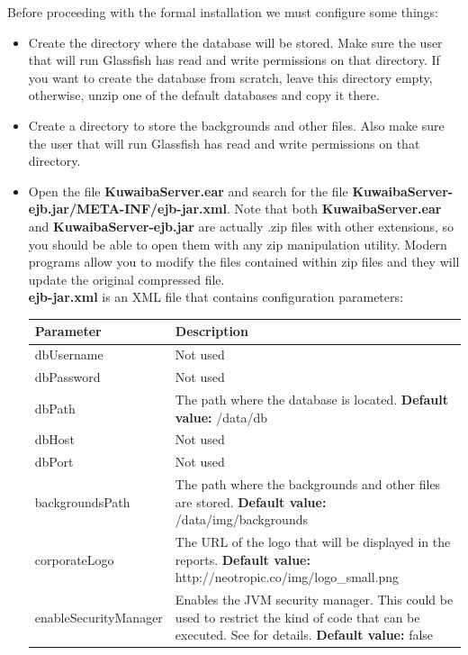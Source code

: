 \documentclass[a4paper]{article}
\begin{document}
			Before proceeding with the formal installation we must configure some things:
			\begin{itemize}
				\item Create the directory where the database will be stored. Make sure the user that will run Glassfish has read and write permissions on that directory. If you want to create the database from scratch, leave this directory empty, otherwise, unzip one of the default databases and copy it there.
				\item Create a directory to store the backgrounds and other files. Also make sure the user that will run Glassfish has read and write permissions on that directory.
				\item Open the file \textbf{KuwaibaServer.ear} and search for the file  \textbf{KuwaibaServer-ejb.jar/META-INF/ejb-jar.xml}. Note that both \textbf{KuwaibaServer.ear} and \textbf{KuwaibaServer-ejb.jar} are actually .zip files with other extensions, so you should be able to open them with any zip manipulation utility. Modern programs allow you to modify the files contained within zip files and they will update the original compressed file.\\
				\textbf{ejb-jar.xml} is an XML file that contains configuration parameters:
				
				\newpage
				\begin{table}[h!]
					\begin{tabular}[h!]{p{5cm}p{10cm}}
						\toprule
						\textbf{Parameter} & \textbf{Description} \\
						\midrule
						dbUsername & Not used \\
						\midrule
						dbPassword & Not used \\
						\midrule
						dbPath & The path where the database is located. \newline \textbf{Default value:} /data/db \\ 
						\midrule
						dbHost & Not used \\
						\midrule
						dbPort & Not used \\
						\midrule
						backgroundsPath & The path where the backgrounds and other files are stored. \newline \textbf{Default value:} /data/img/backgrounds \\
						\midrule
						corporateLogo & The URL of the logo that will be displayed in the reports.  \newline \textbf{Default value:} http://neotropic.co/img/logo\_small.png\\
						\midrule
						enableSecurityManager & Enables the JVM security manager. This could be used to restrict the kind of code that can be executed. See \textbf{\nameref{app:AppendixA}} for details.  \newline \textbf{Default value:} false\\
						\bottomrule
					\end{tabular}
				\end{table}
				

\end{itemize}
\end{document}
